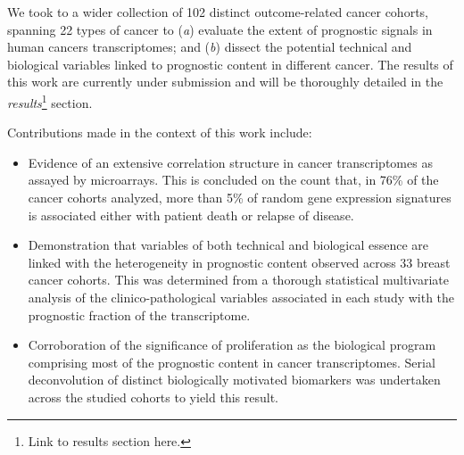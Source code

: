 We took to a wider collection of 102 distinct \mbox{outcome-related} cancer
cohorts, spanning 22 types of cancer to (\emph{a}) evaluate the extent of
prognostic signals in human cancers transcriptomes; and (\emph{b}) dissect the
potential technical and biological variables linked to prognostic content in
different cancer.  The results of this work are currently under submission and
will be thoroughly detailed in the \emph{results}\footnote{Link to results
  section here.} section.

\medskip

Contributions made in the context of this work include:
\begin{itemize}
\item Evidence of an extensive correlation structure in cancer transcriptomes as
  assayed by microarrays.  This is concluded on the count that, in 76\% of the
  cancer cohorts analyzed, more than 5\% of random gene expression signatures is
  associated either with patient death or relapse of disease.
\item Demonstration that variables of both technical and biological essence are
  linked with the heterogeneity in prognostic content observed across 33 breast
  cancer cohorts.  This was determined from a thorough statistical multivariate
  analysis of the \mbox{clinico-pathological} variables associated in each study
  with the prognostic fraction of the transcriptome.
\item Corroboration of the significance of proliferation as the biological
  program comprising most of the prognostic content in cancer transcriptomes.
  Serial deconvolution of distinct biologically motivated biomarkers was
  undertaken across the studied cohorts to yield this result.
\end{itemize}


